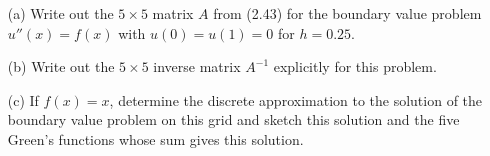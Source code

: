 \documentclass[10pt]{article}
\begin{document}
\maketitle


\begin{problem}
\begin{enumerate}
    \item[(a)] Write out the \(5\times 5\) matrix \(A\) from (2.43) for the boundary value problem \(u''(x)=f(x)\) with \(u(0)=u(1)=0\) for  \(h = 0.25\).
    \item[(b)] Write out the \(5\times 5\) inverse matrix \(A^{-1}\) explicitly for this problem.
    \item[(c)] If \(f(x)=x\), determine the discrete approximation to the solution of the boundary value problem on this grid and sketch this solution and the five Green's functions whose sum gives this solution.
\end{enumerate}
\end{problem}
\end{document}
